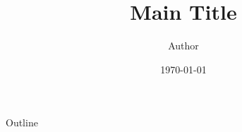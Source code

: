 \documentclass[10pt]{beamer} %
\title[Your Short Title]{Main Title}
\author[email]{Author}
\institute{Affiliation}
\date{\today}
\begin{document}
 {\titlepageBlue
 \begin{frame}
   \titlepage
 \end{frame}
 }

{\titlepageBluenNoFootline
\begin{frame}
	
	\titlepage
	
\end{frame}	
}



 {\titlepageWhite
 \begin{frame}
   \titlepage
 \end{frame}
 }


\begin{frame}{Outline}
  \tableofcontents
\end{frame}


\addtocounter{framenumber}{-1} %

\end{document}
